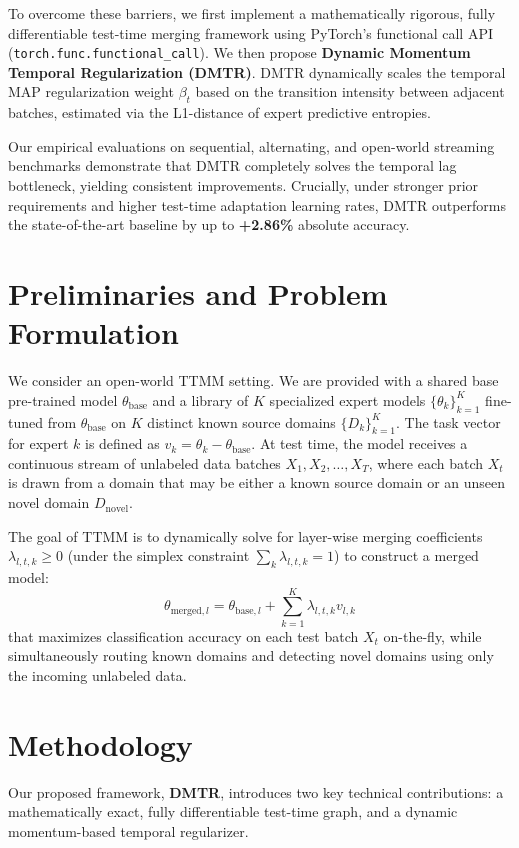 \documentclass{article}
\begin{document}
To overcome these barriers, we first implement a mathematically rigorous, fully differentiable test-time merging framework using PyTorch's functional call API (\texttt{torch.func.functional_call}). We then propose \textbf{Dynamic Momentum Temporal Regularization (DMTR)}. DMTR dynamically scales the temporal MAP regularization weight $\beta_t$ based on the transition intensity between adjacent batches, estimated via the L1-distance of expert predictive entropies. 

Our empirical evaluations on sequential, alternating, and open-world streaming benchmarks demonstrate that DMTR completely solves the temporal lag bottleneck, yielding consistent improvements. Crucially, under stronger prior requirements and higher test-time adaptation learning rates, DMTR outperforms the state-of-the-art baseline by up to \textbf{+2.86\%} absolute accuracy.

\section{Preliminaries and Problem Formulation}
We consider an open-world TTMM setting. We are provided with a shared base pre-trained model $\theta_{\text{base}}$ and a library of $K$ specialized expert models $\{\theta_k\}_{k=1}^K$ fine-tuned from $\theta_{\text{base}}$ on $K$ distinct known source domains $\{D_k\}_{k=1}^K$. The task vector for expert $k$ is defined as $v_k = \theta_k - \theta_{\text{base}}$. At test time, the model receives a continuous stream of unlabeled data batches $X_1, X_2, \dots, X_T$, where each batch $X_t$ is drawn from a domain that may be either a known source domain or an unseen novel domain $D_{\text{novel}}$.

The goal of TTMM is to dynamically solve for layer-wise merging coefficients $\lambda_{l,t,k} \ge 0$ (under the simplex constraint $\sum_k \lambda_{l,t,k} = 1$) to construct a merged model:
\begin{equation}
    \theta_{\text{merged}, l} = \theta_{\text{base}, l} + \sum_{k=1}^K \lambda_{l,t,k} v_{l,k}
\end{equation}
that maximizes classification accuracy on each test batch $X_t$ on-the-fly, while simultaneously routing known domains and detecting novel domains using only the incoming unlabeled data.

\section{Methodology}
Our proposed framework, \textbf{DMTR}, introduces two key technical contributions: a mathematically exact, fully differentiable test-time graph, and a dynamic momentum-based temporal regularizer.
\end{document}
